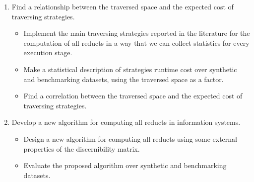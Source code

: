 \documentclass[authoryear,11pt]{elsarticle}
\begin{document}
\begin{enumerate}
  	\item Find a relationship between the traversed space and the expected cost of traversing strategies.
  	\begin{itemize}
  		\item Implement the main traversing strategies reported in the literature for the computation of all
  			  reducts in a way that we can collect statistics for every execution stage.
  		\item Make a statistical description  of strategies runtime cost over synthetic and benchmarking datasets,
  			  using the traversed space as a factor.
  		\item Find a correlation between the traversed space and the expected cost of traversing strategies.
  	\end{itemize}
  	\item Develop a new algorithm for computing all reducts in information systems.
  	\begin{itemize}
  		\item Design a new algorithm for computing all reducts using some external
  		      properties of the discernibility matrix.
  		\item Evaluate the proposed algorithm over synthetic and benchmarking datasets.
  	\end{itemize}
  	

\end{enumerate}
\end{document}
